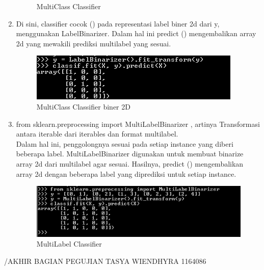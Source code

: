 \begin{enumerate}
\begin{figure}
\begin{center}
   	 \caption{MultiClass Classifier}
	\end{center}
\end{figure}
\item
Di sini, classifier cocok () pada representasi label biner 2d dari y, menggunakan LabelBinarizer. Dalam hal ini predict () mengembalikan array 2d yang mewakili prediksi multilabel yang sesuai.
\begin{figure}
	\begin{center}
   	 \includegraphics[scale=1]{figures/tasya18.png}
   	 \caption{MultiClass Classifier biner 2D}
	\end{center}
\end{figure}
\item
from sklearn.preprocessing import MultiLabelBinarizer , artinya Transformasi antara iterable dari iterables dan format multilabel.\\
Dalam hal ini, penggolongnya sesuai pada setiap instance yang diberi beberapa label. MultiLabelBinarizer digunakan untuk membuat binarize array 2d dari multilabel agar sesuai. Hasilnya, predict () mengembalikan array 2d dengan beberapa label yang diprediksi untuk setiap instance.
\begin{figure}
	\begin{center}
   	 \includegraphics[scale=1]{figures/tasya19.png}
   	 \caption{MultiLabel Classifier}
	\end{center}
\end{figure}
\end{enumerate}
/AKHIR BAGIAN PEGUJIAN TASYA WIENDHYRA 1164086

